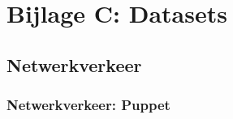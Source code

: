 


\chapter*{Bijlage C: Datasets}


\section*{Netwerkverkeer}
\label{dataset:netwerkverkeer}
\subsection*{Netwerkverkeer: Puppet}
\label{dataset:netwerkverkeer:puppet}
